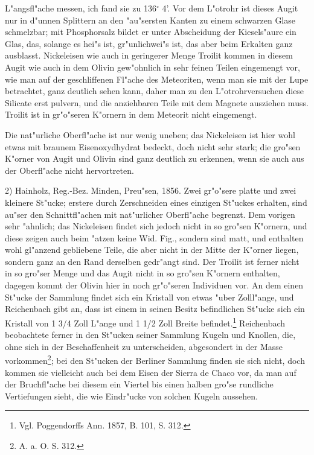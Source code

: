 \documentclass[a4paper, 11pt, oneside]{article}
\begin{document}
L"angsfl"ache messen, ich fand sie zu 136$^{\circ}$ 4’. Vor dem L"otrohr ist dieses Augit nur in d"unnen Splittern an den "au"sersten Kanten zu einem schwarzen Glase schmelzbar; mit Phosphorsalz bildet er unter Abscheidung der Kiesels"aure ein Glas, das, solange es hei"s ist, gr"unlichwei"s ist, das aber beim Erkalten ganz ausblasst. Nickeleisen wie auch in geringerer Menge Troilit kommen in diesem Augit wie auch in dem Olivin gew"ohnlich in sehr feinen Teilen eingemengt vor, wie man auf der geschliffenen Fl"ache des Meteoriten, wenn man sie mit der Lupe betrachtet, ganz deutlich sehen kann, daher man zu den L"otrohrversuchen diese Silicate erst pulvern, und die anziehbaren Teile mit dem Magnete ausziehen muss. Troilit ist in gr"o"seren K"ornern in dem Meteorit nicht eingemengt.

Die nat"urliche Oberfl"ache ist nur wenig uneben; das Nickeleisen ist hier wohl etwas mit braunem Eisenoxydhydrat bedeckt, doch nicht sehr stark; die gro"sen K"orner von Augit und Olivin sind ganz deutlich zu erkennen, wenn sie auch aus der Oberfl"ache nicht hervortreten.

2) Hainholz, Reg.-Bez. Minden, Preu"sen, 1856. Zwei gr"o"sere platte und zwei kleinere St"ucke; erstere durch Zerschneiden eines einzigen St"uckes erhalten, sind au"ser den Schnittfl"achen mit nat"urlicher Oberfl"ache begrenzt. Dem vorigen sehr "ahnlich; das Nickeleisen findet sich jedoch nicht in so gro"sen K"ornern, und diese zeigen auch beim "atzen keine Wid. Fig., sondern sind matt, und enthalten wohl gl"anzend gebliebene Teile, die aber nicht in der Mitte der K"orner liegen, sondern ganz an den Rand derselben gedr"angt sind. Der Troilit ist ferner nicht in so gro"ser Menge und das Augit nicht in so gro"sen K"ornern enthalten, dagegen kommt der Olivin hier in noch gr"o"seren Individuen vor. An dem einen St"ucke der Sammlung findet sich ein Kristall von etwas "uber Zolll"ange, und Reichenbach gibt an, dass ist einem in seinen Besitz befindlichen St"ucke sich ein Kristall von 1 3/4 Zoll L"ange und 1 1/2 Zoll Breite befindet.\footnote{Vgl. Poggendorffs Ann. 1857, B. 101, S. 312.} Reichenbach beobachtete ferner in den St"ucken seiner Sammlung Kugeln und Knollen, die, ohne sich in der Beschaffenheit zu unterscheiden, abgesondert in der Masse vorkommen\footnote{A. a. O. S. 312.}; bei den St"ucken der Berliner Sammlung finden sie sich nicht, doch kommen sie vielleicht auch bei dem Eisen der Sierra de Chaco vor, da man auf der Bruchfl"ache bei diesem ein Viertel bis einen halben gro"se rundliche Vertiefungen sieht, die wie Eindr"ucke von solchen Kugeln aussehen.
\end{document}
